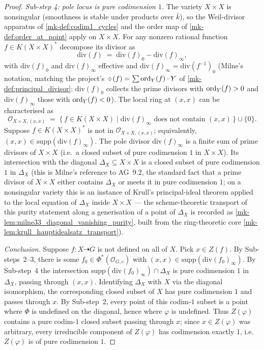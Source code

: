 \begin{proof}
  \emph{Sub-step 4: pole locus is pure codimension \(1\).} The variety \(X \times X\) is
  nonsingular (smoothness is stable under products over \(\bar k\)), so the Weil-divisor
  apparatus of \ref{mk-def:codim1_cycles} and the order map of
  \ref{mk-def:order_at_point} apply on \(X \times X\). For any nonzero rational function
  \(f \in K(X \times X)^\ast\) decompose its divisor as
  \[
    \mathrm{div}(f) \;=\; \mathrm{div}(f)_0 - \mathrm{div}(f)_\infty,
  \]
  with \(\mathrm{div}(f)_0\) and \(\mathrm{div}(f)_\infty\) effective and
  \(\mathrm{div}(f)_\infty = \mathrm{div}(f^{-1})_0\) (Milne's notation, matching the
  project's \(\div(f) = \sum \operatorname{ord}_Y(f) \cdot Y\) of
  \ref{mk-def:principal_divisor}: \(\mathrm{div}(f)_0\) collects the prime divisors with
  \(\operatorname{ord}_Y(f) > 0\) and \(\mathrm{div}(f)_\infty\) those with \(\operatorname{ord}_Y(f) < 0\)). The local
  ring at \((x, x)\) can be characterised as
  \[
    \mathcal O_{X \times X, (x, x)}
    \;=\; \bigl\{\, f \in K(X \times X) \;\big|\;
    \mathrm{div}(f)_\infty \text{ does not contain } (x, x) \,\bigr\} \cup \{0\}.
  \]
  Suppose \(f \in K(X \times X)^\ast\) is not in \(\mathcal O_{X \times X, (x, x)}\);
  equivalently, \((x, x) \in \mathrm{supp}(\mathrm{div}(f)_\infty)\). The pole divisor
  \(\mathrm{div}(f)_\infty\) is a finite sum of prime divisors of \(X \times X\) (i.e.\ a
  closed subset of pure codimension \(1\) in \(X \times X\)). Its intersection with the
  diagonal \(\Delta_X \subseteq X \times X\) is a closed subset of pure codimension \(1\)
  in \(\Delta_X\) (this is Milne's reference to AG~9.2, the standard fact that a prime
  divisor of \(X \times X\) either contains \(\Delta_X\) or meets it in pure codimension
  \(1\); on a nonsingular variety this is an instance of Krull's principal-ideal theorem
  applied to the local equation of \(\Delta_X\) inside \(X \times X\) --- the
  scheme-theoretic transport of this purity statement along a generisation of a
  point of \(\Delta_X\) is recorded as \ref{mk-lem:milne33_diagonal_vanishing_purity},
  built from the ring-theoretic core \ref{mk-lem:krull_hauptidealsatz_transport}).

  \emph{Conclusion.} Suppose \(f \colon X \dashrightarrow G\) is not defined on all of
  \(X\). Pick \(x \in Z(f)\). By Sub-steps~2--3, there is some \(f_0 \in
  \Phi^\ast(\mathcal O_{G, e})\) with \((x, x) \in \mathrm{supp}(\mathrm{div}(f_0)_\infty)\).
  By Sub-step~4 the intersection \(\mathrm{supp}(\mathrm{div}(f_0)_\infty) \cap
  \Delta_X\) is pure codimension \(1\) in \(\Delta_X\), passing through \((x, x)\).
  Identifying \(\Delta_X\) with \(X\) via the diagonal isomorphism, the corresponding
  closed subset of \(X\) has pure codimension \(1\) and passes through \(x\). By Sub-step~2,
  every point of this codim-\(1\) subset is a point where \(\Phi\) is undefined on the
  diagonal, hence where \(\varphi\) is undefined. Thus \(Z(\varphi)\) contains a pure
  codim-\(1\) closed subset passing through \(x\); since \(x \in Z(\varphi)\) was arbitrary,
  every irreducible component of \(Z(\varphi)\) has codimension exactly \(1\), i.e.\
  \(Z(\varphi)\) is of pure codimension \(1\).
\end{proof}

